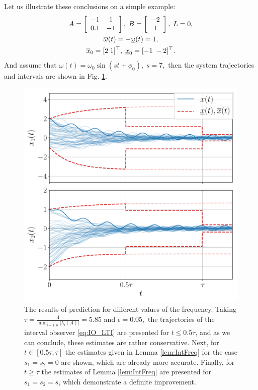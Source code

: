 \begin{example*}
	Let us illustrate these conclusions on a simple example:
	\begin{gather*}
	A=\left[\begin{array}{cc}
	-1 & 1\\
	0.1 & -1
	\end{array}\right],\;B=\left[\begin{array}{c}
	-2\\
	1
	\end{array}\right],\;L=0,\\
	\overline{\omega}(t)=-\underline{\omega}(t)=1,\\
	\overline{x}_{0}=[2\;1]^{\top},\;\underline{x}_{0}=[-1\;-2]^{\top}.
	\end{gather*}
	And assume that
	$
	\omega(t)=\omega_0\sin(st+\phi_0),\;s=7,
	$
	then the system trajectories and intervals are shown in Fig. \ref{fig:IntFreq}. 
	\begin{figure}
		\begin{centering}
			\includegraphics[width=0.8\linewidth]{img/asymptotic}
			\par\end{centering}
		\caption{\label{fig:IntFreq} The results of prediction for different values
			of the frequency. Taking $\tau=\frac{4}{\min_{i=\overline{1,n}}|\lambda_{i}(A)|}=5.85$ and $\epsilon=0.05,$ the trajectories of the interval observer \eqref{eq:IO_LTI} are presented for $t\leq0.5\tau$, and as we can conclude, these estimates are rather conservative. Next, for $t\in[0.5\tau,\tau]$ the estimates given in Lemma \ref{lem:IntFreq} for the case $s_{1}=s_{2}=0$ are shown, which are already more accurate. Finally, for $t\geq\tau$ the estimates of Lemma \ref{lem:IntFreq} are presented for $s_{1}=s_{2}=s$, which demonstrate a definite improvement. }
	\end{figure}
\end{example*}

